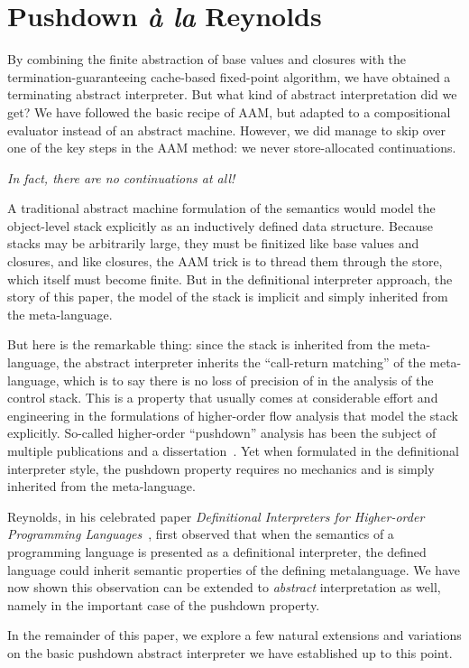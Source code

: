 \section{Pushdown \emph{à la} Reynolds}\label{s:reynolds}

By combining the finite abstraction of base values and closures with the
termination-guaranteeing cache-based fixed-point algorithm, we have obtained a
terminating abstract interpreter.  But what kind of abstract interpretation did
we get?
We have followed the basic recipe of AAM, but adapted to a compositional
evaluator instead of an abstract machine.  However, we did manage to skip over
one of the key steps in the AAM method: we never store-allocated continuations.
\begin{center}
\emph{In fact, there are no continuations at all!}
\end{center}
A traditional abstract machine formulation of the semantics would model the
object-level stack explicitly as an inductively defined data structure. Because
stacks may be arbitrarily large, they must be finitized like base values and
closures, and like closures, the AAM trick is to thread them through the store,
which itself must become finite. But in the definitional interpreter approach,
the story of this paper, the model of the stack is implicit and simply
inherited from the meta-language.

But here is the remarkable thing: since the stack is inherited from the
meta-language, the abstract interpreter inherits the ``call-return matching''
of the meta-language, which is to say there is no loss of precision of in the
analysis of the control stack.  This is a property that usually comes at
considerable effort and engineering in the formulations of higher-order flow
analysis that model the stack explicitly.  So-called higher-order ``pushdown''
analysis has been the subject of multiple publications and a
dissertation~\cite%
{dvanhorn:Vardoulakis2011CFA2%
,dvanhorn:Earl2010Pushdown%
,local:vardoulakis-diss12%
,dvanhorn:VanHorn2012Systematic%
,dvanhorn:Earl2012Introspective%
,dvanhorn:Johnson2014Abstracting%
,dvanhorn:Johnson2014Pushdown%
,local:p4f%
}. Yet when formulated in the definitional interpreter style, the pushdown
property requires no mechanics and is simply inherited from the meta-language.

Reynolds, in his celebrated paper \emph{Definitional Interpreters for
Higher-order Programming Languages}~\cite{dvanhorn:reynolds-acm72}, first
observed that when the semantics of a programming language is presented as a
definitional interpreter, the defined language could inherit semantic
properties of the defining metalanguage.  We have now shown this observation
can be extended to \emph{abstract} interpretation as well, namely in the
important case of the pushdown property.

In the remainder of this paper, we explore a few natural extensions and
variations on the basic pushdown abstract interpreter we have established up to
this point.
